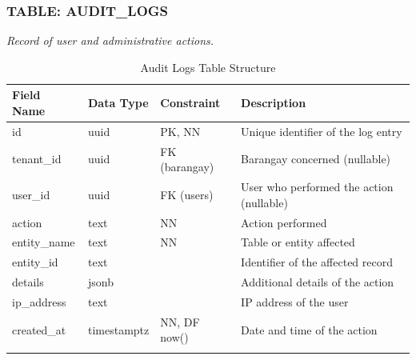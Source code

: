 \subsubsection*{TABLE: AUDIT\_LOGS}
\noindent\textit{Record of user and administrative actions.}
\begin{longtable}{|p{3.2cm}|p{2.2cm}|p{3.2cm}|p{5.4cm}|}
\hline
\textbf{Field Name} & \textbf{Data Type} & \textbf{Constraint} & \textbf{Description} \\ \hline
\endhead
\hline \endfoot
\hline \endlastfoot
id & uuid & PK, NN & Unique identifier of the log entry \\ \hline
tenant\_id & uuid & FK (barangay) & Barangay concerned (nullable) \\ \hline
user\_id & uuid & FK (users) & User who performed the action (nullable) \\ \hline
action & text & NN & Action performed \\ \hline
entity\_name & text & NN & Table or entity affected \\ \hline
entity\_id & text & & Identifier of the affected record \\ \hline
details & jsonb & & Additional details of the action \\ \hline
ip\_address & text & & IP address of the user \\ \hline
created\_at & timestamptz & NN, DF now() & Date and time of the action \\ \hline
\caption{Audit Logs Table Structure}
\label{tab:audit_logs}
\end{longtable}